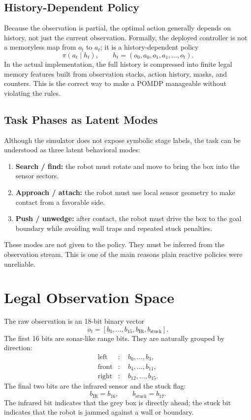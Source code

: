 \documentclass[11pt, oneside]{article}   	%
\begin{document}
\subsection{History-Dependent Policy}

Because the observation is partial, the optimal action generally depends on history, not
just the current observation. Formally, the deployed controller is not a memoryless map
from \(o_t\) to \(a_t\); it is a history-dependent policy
\[
  \pi(a_t\mid h_t),
  \qquad
  h_t=(o_0,a_0,o_1,a_1,\dots,o_t).
\]
In the actual implementation, the full history is compressed into finite legal memory
features built from observation stacks, action history, masks, and counters. This is the
correct way to make a POMDP manageable without violating the rules.

\subsection{Task Phases as Latent Modes}

Although the simulator does not expose symbolic stage labels, the task can be understood
as three latent behavioral modes:
\begin{enumerate}[leftmargin=1.5em]
  \item \textbf{Search / find:} the robot must rotate and move to bring the box into the
  sensor sectors.
  \item \textbf{Approach / attach:} the robot must use local sensor geometry to make
  contact from a favorable side.
  \item \textbf{Push / unwedge:} after contact, the robot must drive the box to the goal
  boundary while avoiding wall traps and repeated stuck penalties.
\end{enumerate}
These modes are not given to the policy. They must be inferred from the observation
stream. This is one of the main reasons plain reactive policies were unreliable.

\section{Legal Observation Space}

The raw observation is an 18-bit binary vector
\[
  o_t=[b_0,\ldots,b_{15},b_{\text{IR}},b_{\text{stuck}}].
\]
The first 16 bits are sonar-like range bits. They are naturally grouped by direction:
\[
\begin{aligned}
  \text{left}  &: \quad b_0,\ldots,b_3,\\
  \text{front} &: \quad b_4,\ldots,b_{11},\\
  \text{right} &: \quad b_{12},\ldots,b_{15}.
\end{aligned}
\]
The final two bits are the infrared sensor and the stuck flag:
\[
  b_{\text{IR}}=b_{16},
  \qquad
  b_{\text{stuck}}=b_{17}.
\]
The infrared bit indicates that the grey box is directly ahead; the stuck bit indicates
that the robot is jammed against a wall or boundary.
\end{document}
